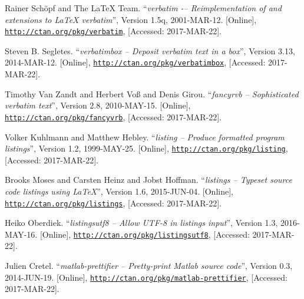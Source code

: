 \documentclass[article,a4paper,oneside,10pt]{memoir}
\begin{document}
\vfill
\begin{thebibliography}{1}

        Rainer Sch\"opf and The \LaTeX{} Team.
        ``\emph{verbatim -– Reimplementation of and extensions to \LaTeX{} verbatim}'',
        Version 1.5q,
        2001-MAR-12.
        [Online],
        \href{http://ctan.org/pkg/verbatim}{\nolinkurl{http://ctan.org/pkg/verbatim}},
        [Accessed: 2017-MAR-22].

        Steven B. Segletes.
        ``\emph{verbatimbox – Deposit verbatim text in a box}'',
        Version 3.13,
        2014-MAR-12.
        [Online],
        \href{http://ctan.org/pkg/verbatimbox}{\nolinkurl{http://ctan.org/pkg/verbatimbox}},
        [Accessed: 2017-MAR-22].

        Timothy Van Zandt and Herbert Vo\ss{} and Denis Girou.
        ``\emph{fancyrvb -- Sophisticated verbatim text}'',
        Version 2.8,
        2010-MAY-15.
        [Online],
        \href{http://ctan.org/pkg/fancyvrb}{\nolinkurl{http://ctan.org/pkg/fancyvrb}},
        [Accessed: 2017-MAR-22].

        Volker Kuhlmann and Matthew Hebley.
        ``\emph{listing -- Produce formatted program listings}'',
        Version 1.2,
        1999-MAY-25.
        [Online],
        \href{http://ctan.org/pkg/listing}{\nolinkurl{http://ctan.org/pkg/listing}},
        [Accessed: 2017-MAR-22].

        Brooks Moses and Carsten Heinz and Jobst Hoffman.
        ``\emph{listings -- Typeset source code listings using \LaTeX}'',
        Version 1.6,
        2015-JUN-04.
        [Online],
        \href{http://ctan.org/pkg/listings}{\nolinkurl{http://ctan.org/pkg/listings}},
        [Accessed: 2017-MAR-22].

        Heiko Oberdiek.
        ``\emph{listingsutf8 -- Allow UTF-8 in listings input}'',
        Version 1.3,
        2016-MAY-16.
        [Online],
        \href{http://ctan.org/pkg/listingsutf8}{\nolinkurl{http://ctan.org/pkg/listingsutf8}},
        [Accessed: 2017-MAR-22].

        Julien Cretel.
        ``\emph{matlab-prettifier -- Pretty-print Matlab source code}'',
        Version 0.3,
        2014-JUN-19.
        [Online],
        \href{http://ctan.org/pkg/matlab-prettifier}{\nolinkurl{http://ctan.org/pkg/matlab-prettifier}},
        [Accessed: 2017-MAR-22].


\end{thebibliography}
\end{document}
